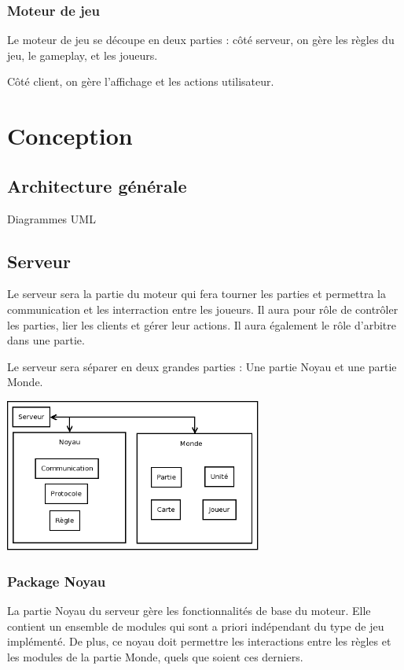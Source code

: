 \documentclass[a4paper,10pt]{report}
\begin{document}
      \subsection{Moteur de jeu}

        Le moteur de jeu se découpe en deux parties : côté serveur, on gère les règles du jeu, le gameplay, et les joueurs. 

        Côté client, on gère l'affichage et les actions utilisateur. 


  \chapter{Conception}

    \section{Architecture générale}

      Diagrammes UML


    \section{Serveur}

      Le serveur sera la partie du moteur qui fera tourner les parties et permettra la communication et les interraction entre les joueurs. Il aura pour rôle de contrôler les parties, lier les clients et gérer leur actions. Il aura également le rôle d'arbitre dans une partie. 

      Le serveur sera séparer en deux grandes parties : Une partie Noyau et une partie Monde.

      \includegraphics[width=320px]{img/server-organisation.png}

      \subsection{Package Noyau}

	La partie Noyau du serveur gère les fonctionnalités de base du moteur. Elle contient un ensemble de modules qui sont a priori indépendant du type de jeu implémenté. De plus, ce noyau doit permettre les interactions entre les règles et les modules de la partie Monde, quels que soient ces derniers. 
\end{document}
